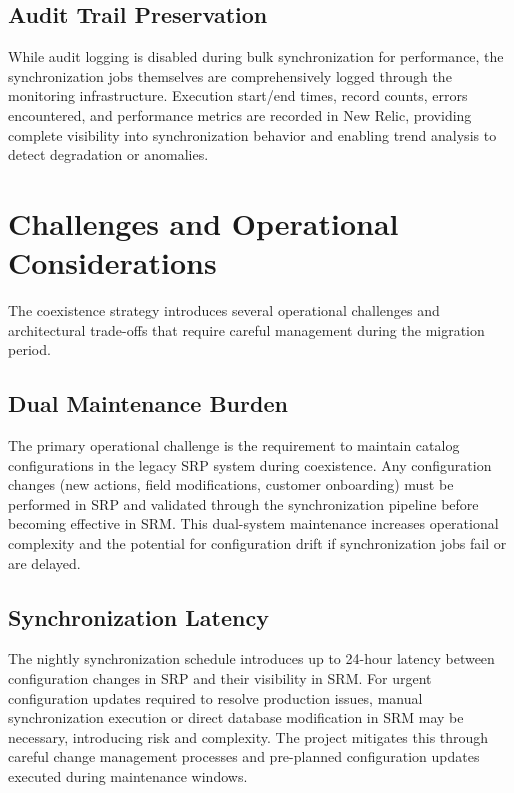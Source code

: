 \subsection{Audit Trail Preservation}

While audit logging is disabled during bulk synchronization for performance, the synchronization jobs themselves are comprehensively logged through the monitoring infrastructure. Execution start/end times, record counts, errors encountered, and performance metrics are recorded in New Relic, providing complete visibility into synchronization behavior and enabling trend analysis to detect degradation or anomalies.

\section{Challenges and Operational Considerations}

The coexistence strategy introduces several operational challenges and architectural trade-offs that require careful management during the migration period.

\subsection{Dual Maintenance Burden}

The primary operational challenge is the requirement to maintain catalog configurations in the legacy SRP system during coexistence. Any configuration changes (new actions, field modifications, customer onboarding) must be performed in SRP and validated through the synchronization pipeline before becoming effective in SRM. This dual-system maintenance increases operational complexity and the potential for configuration drift if synchronization jobs fail or are delayed.

\subsection{Synchronization Latency}

The nightly synchronization schedule introduces up to 24-hour latency between configuration changes in SRP and their visibility in SRM. For urgent configuration updates required to resolve production issues, manual synchronization execution or direct database modification in SRM may be necessary, introducing risk and complexity. The project mitigates this through careful change management processes and pre-planned configuration updates executed during maintenance windows.

